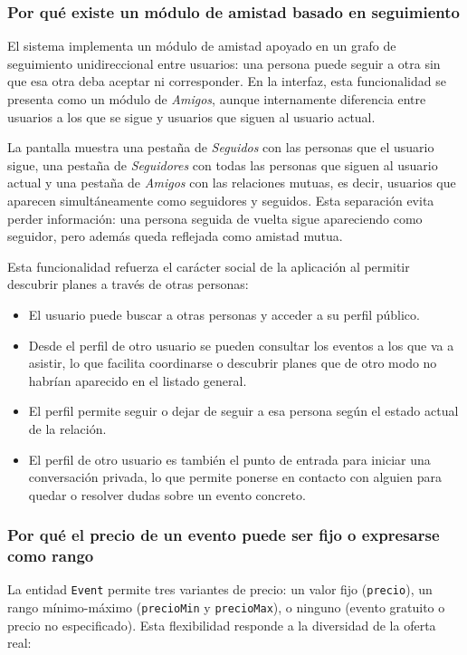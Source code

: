 \subsubsection{Por qué existe un módulo de amistad basado en seguimiento}

El sistema implementa un módulo de amistad apoyado en un grafo de seguimiento unidireccional entre usuarios: una persona puede seguir a otra sin que esa otra deba aceptar ni corresponder. En la interfaz, esta funcionalidad se presenta como un módulo de \textit{Amigos}, aunque internamente diferencia entre usuarios a los que se sigue y usuarios que siguen al usuario actual.

La pantalla muestra una pestaña de \textit{Seguidos} con las personas que el usuario sigue, una pestaña de \textit{Seguidores} con todas las personas que siguen al usuario actual y una pestaña de \textit{Amigos} con las relaciones mutuas, es decir, usuarios que aparecen simultáneamente como seguidores y seguidos. Esta separación evita perder información: una persona seguida de vuelta sigue apareciendo como seguidor, pero además queda reflejada como amistad mutua.

Esta funcionalidad refuerza el carácter social de la aplicación al permitir descubrir planes a través de otras personas:

\begin{itemize}
    \item El usuario puede buscar a otras personas y acceder a su perfil público.
    \item Desde el perfil de otro usuario se pueden consultar los eventos a los que va a asistir, lo que facilita coordinarse o descubrir planes que de otro modo no habrían aparecido en el listado general.
    \item El perfil permite seguir o dejar de seguir a esa persona según el estado actual de la relación.
    \item El perfil de otro usuario es también el punto de entrada para iniciar una conversación privada, lo que permite ponerse en contacto con alguien para quedar o resolver dudas sobre un evento concreto.
\end{itemize}

\subsubsection{Por qué el precio de un evento puede ser fijo o expresarse como rango}

La entidad \texttt{Event} permite tres variantes de precio: un valor fijo (\texttt{precio}), un rango mínimo-máximo (\texttt{precioMin} y \texttt{precioMax}), o ninguno (evento gratuito o precio no especificado). Esta flexibilidad responde a la diversidad de la oferta real:

